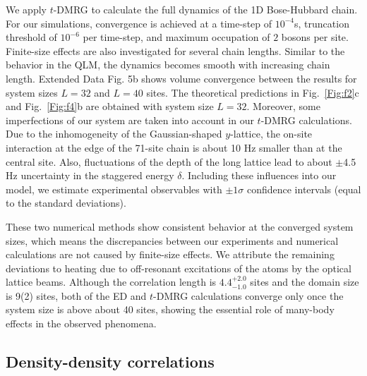 \documentclass[aps,prl,twocolumn,superscriptaddress,footinbib,linenumbers]{revtex4}
\begin{document}
We apply $t$-DMRG \cite{Schollwoeck:2011s,Mcculloch:2019s} to calculate the full dynamics of the 1D Bose-Hubbard chain. For our simulations, convergence is achieved at a time-step of $10^{-4}$s, truncation threshold of $10^{-6}$ per time-step, and maximum occupation of $2$ bosons per site. Finite-size effects are also investigated for several chain lengths. Similar to the behavior in the QLM, the dynamics becomes smooth with increasing chain length. Extended Data Fig. 5b shows volume convergence between the results for system sizes $L=32$ and $L=40$ sites. The theoretical predictions in Fig.~\ref{Fig:f2}c and Fig.~\ref{Fig:f4}b are obtained with system size $L=32$. Moreover, some imperfections of our system are taken into account in our $t$-DMRG calculations. Due to the inhomogeneity of the Gaussian-shaped $y$-lattice, the on-site interaction at the edge of the 71-site chain is about 10 Hz smaller than at the central site. Also, fluctuations of the depth of the long lattice lead to about $\pm$4.5 Hz uncertainty in the staggered energy $\delta$. Including these influences into our model, we estimate experimental observables with $\pm 1 \sigma$ confidence intervals (equal to the standard deviations).

These two numerical methods show consistent behavior at the converged system sizes, which means the discrepancies between our experiments and numerical calculations are not caused by finite-size effects. We attribute the remaining deviations to heating due to off-resonant excitations of the atoms by the optical lattice beams. Although the correlation length is $4.4^{+2.0}_{-1.0}$ sites and the domain size is 9(2) sites, both of the ED and $t$-DMRG calculations converge only once the system size is above about 40 sites, showing the essential role of many-body effects in the observed phenomena.


\subsection{Density-density correlations}
\end{document}
